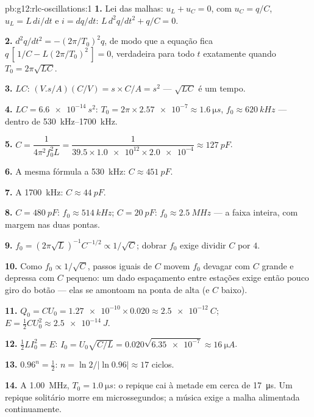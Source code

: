 \begin{solution}{pb:g12:rlc-oscillations:1}
\textbf{1.} Lei das malhas: $u_L + u_C = 0$, com $u_C = q/C$,
$u_L = L\,di/dt$ e $i = dq/dt$: $L\,d^2q/dt^2 + q/C = 0$.

\textbf{2.} $d^2q/dt^2 = -(2\pi/T_0)^2 q$, de modo que a equação fica
$q\,[\,1/C - L(2\pi/T_0)^2\,] = 0$, verdadeira para todo $t$ exatamente
quando $T_0 = 2\pi\sqrt{LC}$.

\textbf{3.} $LC$: $(\unit{V.s/A})(\unit{C/V}) = \unit{s} \times
\unit{C/A} = \unit{s^2}$ --- $\sqrt{LC}$ é um tempo.

\textbf{4.} $LC = \qty{6.6e-14}{s^2}$:
$T_0 = 2\pi \times \num{2.57e-7} \approx \qty{1.6}{\micro s}$,
$f_0 \approx \qty{620}{kHz}$ --- dentro de \qtyrange{530}{1700}{kHz}.

\textbf{5.} $C = \dfrac{1}{4\pi^2 f_0^2 L} = \dfrac{1}{39.5 \times
\num{1.0e12} \times \num{2.0e-4}} \approx \qty{127}{pF}$.

\textbf{6.} A mesma fórmula a \qty{530}{kHz}: $C \approx \qty{451}{pF}$.

\textbf{7.} A \qty{1700}{kHz}: $C \approx \qty{44}{pF}$.

\textbf{8.} $C = \qty{480}{pF}$: $f_0 \approx \qty{514}{kHz}$;
$C = \qty{20}{pF}$: $f_0 \approx \qty{2.5}{MHz}$ --- a faixa inteira, com
margem nas duas pontas.

\textbf{9.} $f_0 = (2\pi\sqrt{L})^{-1}C^{-1/2} \propto 1/\sqrt{C}$;
dobrar $f_0$ exige dividir $C$ por $4$.

\textbf{10.} Como $f_0 \propto 1/\sqrt{C}$, passos iguais de $C$ movem
$f_0$ devagar com $C$ grande e depressa com $C$ pequeno: um dado
espaçamento entre estações exige então pouco giro do botão --- elas se
amontoam na ponta de  alta (e $C$ baixo).

\textbf{11.} $Q_0 = CU_0 = \num{1.27e-10} \times 0.020 \approx
\qty{2.5e-12}{C}$; $E = \tfrac12 CU_0^2 \approx \qty{2.5e-14}{J}$.

\textbf{12.} $\tfrac12 LI_0^2 = E$:
$I_0 = U_0\sqrt{C/L} = 0.020\sqrt{\num{6.35e-7}} \approx
\qty{16}{\micro A}$.

\textbf{13.} $0.96^n = \tfrac12$:
$n = \ln 2/\lvert\ln 0.96\rvert \approx 17$ ciclos.

\textbf{14.} A \qty{1.00}{MHz}, $T_0 = \qty{1.0}{\micro s}$: o repique
cai à metade em cerca de \qty{17}{\micro s}. Um repique solitário morre
em microssegundos; a música exige a malha alimentada continuamente.


\end{solution}
